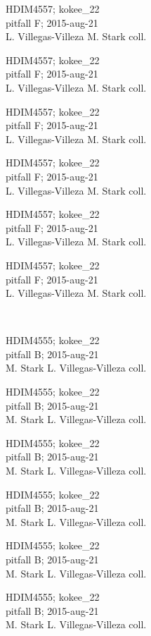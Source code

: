 \documentclass[2pt]{extarticle}
\begin{document}
\noindent
\parbox{0.16\textwidth}{\tiny \raggedright \rule[-0.3\baselineskip]{0pt}{10pt}HDIM4557; kokee\_22\\ pitfall F; 2015-aug-21\\ L. Villegas-Villeza M. Stark coll.}
\parbox{0.16\textwidth}{\tiny \raggedright \rule[-0.3\baselineskip]{0pt}{10pt}HDIM4557; kokee\_22\\ pitfall F; 2015-aug-21\\ L. Villegas-Villeza M. Stark coll.}
\parbox{0.16\textwidth}{\tiny \raggedright \rule[-0.3\baselineskip]{0pt}{10pt}HDIM4557; kokee\_22\\ pitfall F; 2015-aug-21\\ L. Villegas-Villeza M. Stark coll.}
\parbox{0.16\textwidth}{\tiny \raggedright \rule[-0.3\baselineskip]{0pt}{10pt}HDIM4557; kokee\_22\\ pitfall F; 2015-aug-21\\ L. Villegas-Villeza M. Stark coll.}
\parbox{0.16\textwidth}{\tiny \raggedright \rule[-0.3\baselineskip]{0pt}{10pt}HDIM4557; kokee\_22\\ pitfall F; 2015-aug-21\\ L. Villegas-Villeza M. Stark coll.}
\parbox{0.16\textwidth}{\tiny \raggedright \rule[-0.3\baselineskip]{0pt}{10pt}HDIM4557; kokee\_22\\ pitfall F; 2015-aug-21\\ L. Villegas-Villeza M. Stark coll.} \\ 
\vspace{0.001in} 

\noindent
\parbox{0.16\textwidth}{\tiny \raggedright \rule[-0.3\baselineskip]{0pt}{10pt}HDIM4555; kokee\_22\\ pitfall B; 2015-aug-21\\ M. Stark L. Villegas-Villeza coll.}
\parbox{0.16\textwidth}{\tiny \raggedright \rule[-0.3\baselineskip]{0pt}{10pt}HDIM4555; kokee\_22\\ pitfall B; 2015-aug-21\\ M. Stark L. Villegas-Villeza coll.}
\parbox{0.16\textwidth}{\tiny \raggedright \rule[-0.3\baselineskip]{0pt}{10pt}HDIM4555; kokee\_22\\ pitfall B; 2015-aug-21\\ M. Stark L. Villegas-Villeza coll.}
\parbox{0.16\textwidth}{\tiny \raggedright \rule[-0.3\baselineskip]{0pt}{10pt}HDIM4555; kokee\_22\\ pitfall B; 2015-aug-21\\ M. Stark L. Villegas-Villeza coll.}
\parbox{0.16\textwidth}{\tiny \raggedright \rule[-0.3\baselineskip]{0pt}{10pt}HDIM4555; kokee\_22\\ pitfall B; 2015-aug-21\\ M. Stark L. Villegas-Villeza coll.}
\parbox{0.16\textwidth}{\tiny \raggedright \rule[-0.3\baselineskip]{0pt}{10pt}HDIM4555; kokee\_22\\ pitfall B; 2015-aug-21\\ M. Stark L. Villegas-Villeza coll.} \\ 
\vspace{0.001in} 
\end{document}
